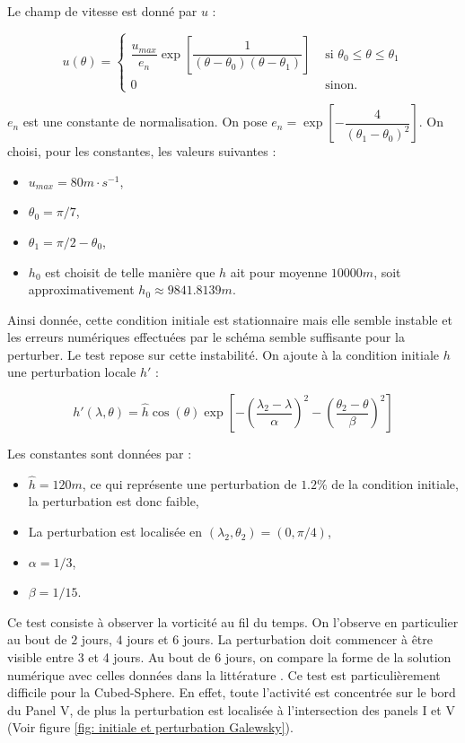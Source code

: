 Le champ de vitesse est donné par $u$ :

\begin{equation}
u(\theta) = \left\lbrace
\begin{array}{ll}
\dfrac{u_{max}}{e_n} \exp \left[ \dfrac{1}{(\theta-\theta_0)(\theta-\theta_1)} \right] & \text{ si } \theta_0 \leq \theta \leq \theta_1 \\
0 & \text{ sinon.}
\end{array}
\right.
\end{equation}

$e_n$ est une constante de normalisation. On pose $e_n = \exp\left[ - \dfrac{4}{(\theta_1-\theta_0)^2} \right]$. On choisi, pour les constantes, les valeurs suivantes :
\begin{itemize}
\item $u_{max}=80 m \cdot  \si{s^{-1}}$,
\item $\theta_0 = \pi/7$,
\item $\theta_1 = \pi/2 - \theta_0$,
\item $h_0$ est choisit de telle manière que $h$ ait pour moyenne $10000 \si{m}$, soit approximativement $h_0 \approx 9841.8139 \si{m}$.
\end{itemize}

Ainsi donnée, cette condition initiale est stationnaire mais elle semble instable et les erreurs numériques effectuées par le schéma semble suffisante pour la perturber. Le test repose sur cette instabilité. On ajoute à la condition initiale $h$ une perturbation locale $h'$ :

\begin{equation}
h'(\lambda, \theta) = \hat{h} \cos ( \theta ) \exp \left[ - \left( \dfrac{\lambda_2 - \lambda}{\alpha} \right)^2 - \left( \dfrac{\theta_2 - \theta}{\beta} \right)^2 \right]
\end{equation}

Les constantes sont données par :
\begin{itemize}
\item $\hat{h} = 120m$, ce qui représente une perturbation de $1.2 \%$ de la condition initiale, la perturbation est donc faible,
\item La perturbation est localisée en $(\lambda_2, \theta_2) = (0, \pi/4)$,
\item $\alpha = 1/3$,
\item $\beta = 1/15$.
\end{itemize}

Ce test consiste à observer la vorticité au fil du temps. On l'observe en particulier au bout de $2$ jours, $4$ jours et $6$ jours. La perturbation doit commencer à être visible entre 3 et 4 jours. Au bout de 6 jours, on compare la forme de la solution numérique avec celles données dans la littérature \cite{Galewsky2004, Chen2008}. Ce test est particulièrement difficile pour la Cubed-Sphere. En effet, toute l'activité est concentrée sur le bord du Panel V, de plus la perturbation est localisée à l'intersection des panels I et V (Voir figure \ref{fig: initiale et perturbation Galewsky}).

